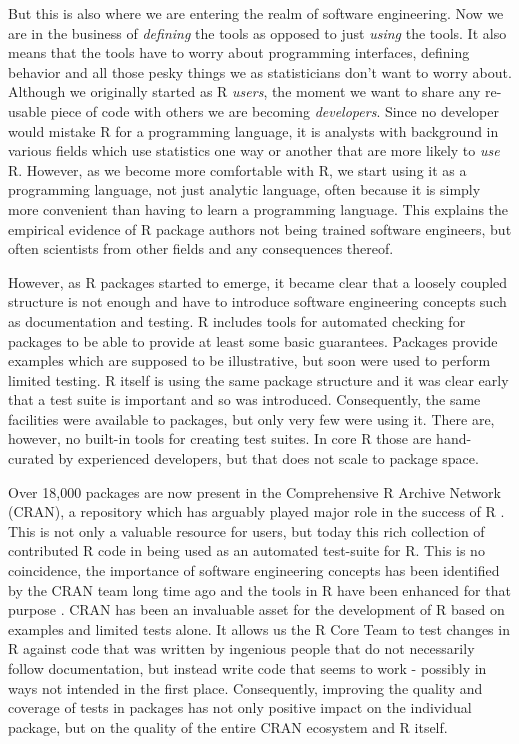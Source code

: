But this is also where we are entering the realm of software
engineering. Now we are in the business of \emph{defining} the tools as
opposed to just \emph{using} the tools. It also means that the tools
have to worry about programming interfaces, defining behavior and all
those pesky things we as statisticians don't want to worry about.
Although we originally started as R \emph{users}, the moment we want to
share any re-usable piece of code with others we are becoming
\emph{developers}. Since no developer would mistake R for a programming
language, it is analysts with background in various fields which use
statistics one way or another that are more likely to \emph{use} R.
However, as we become more comfortable with R, we start using it as a
programming language, not just analytic language, often because it is
simply more convenient than having to learn a programming language. This
explains the empirical evidence \citep{Pinto} of R package authors not
being trained software engineers, but often scientists from other fields
and any consequences thereof.

However, as R packages started to emerge, it became clear that a loosely
coupled structure is not enough and have to introduce software
engineering concepts such as documentation and testing. R includes tools
for automated checking for packages to be able to provide at least some
basic guarantees. Packages provide examples which are supposed to be
illustrative, but soon were used to perform limited testing. R itself is
using the same package structure and it was clear early that a test
suite is important and so was introduced. Consequently, the same
facilities were available to packages, but only very few were using it.
There are, however, no built-in tools for creating test suites. In core
R those are hand-curated by experienced developers, but that does not
scale to package space.

Over 18,000 packages are now present in the Comprehensive R Archive
Network (CRAN), a repository which has arguably played major role in the
success of R \citep{CRAN1}. This is not only a valuable resource for
users, but today this rich collection of contributed R code in being
used as an automated test-suite for R. This is no coincidence, the
importance of software engineering concepts has been identified by the
CRAN team long time ago and the tools in R have been enhanced for that
purpose \citep{CRAN2}. CRAN has been an invaluable asset for the
development of R based on examples and limited tests alone. It allows us
the R Core Team to test changes in R against code that was written by
ingenious people that do not necessarily follow documentation, but
instead write code that seems to work - possibly in ways not intended in
the first place. Consequently, improving the quality and coverage of
tests in packages has not only positive impact on the individual
package, but on the quality of the entire CRAN ecosystem and R itself.

